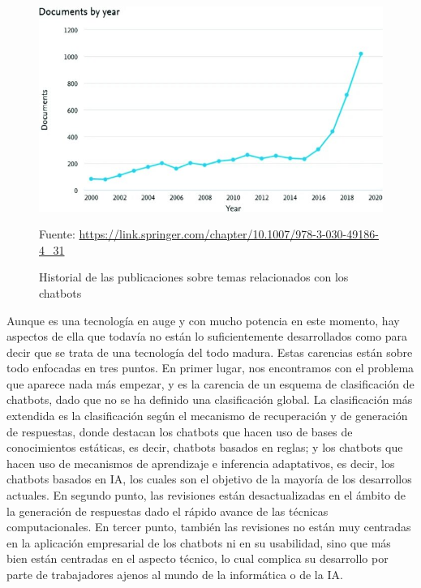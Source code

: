 \begin{figure}[h]
\centering
\includegraphics[width=1.0\textwidth]{imagenes/02_EstadoDelArte/publicaciones_chatbots.jpg}
\begin{center}
Fuente: \url{https://link.springer.com/chapter/10.1007/978-3-030-49186-4_31}
\end{center}
\caption{Historial de las publicaciones sobre temas relacionados con los chatbots}
\label{fig:publicaciones_chatbot}
\end{figure}

Aunque es una tecnología en auge y con mucho potencia en este momento, hay aspectos de ella que todavía no están lo suficientemente desarrollados como para decir que se trata de una tecnología del todo madura. Estas carencias están sobre todo enfocadas en tres puntos.
En primer lugar, nos encontramos con el problema que aparece nada más empezar, y es la carencia de un esquema de clasificación de chatbots, dado que no se ha definido una clasificación global. La clasificación más extendida es la clasificación según el mecanismo de recuperación y de generación de respuestas, donde destacan los chatbots que hacen uso de bases de conocimientos estáticas, es decir, chatbots basados en reglas; y los chatbots que hacen uso de mecanismos de aprendizaje e inferencia adaptativos, es decir, los chatbots basados en \gls{IA}, los cuales son el objetivo de la mayoría de los desarrollos actuales. En segundo punto, las revisiones están desactualizadas en el ámbito de la generación de respuestas dado el rápido avance de las técnicas computacionales. En tercer punto, también las revisiones no están muy centradas en la aplicación empresarial de los chatbots ni en su usabilidad, sino que más bien están centradas en el aspecto técnico, lo cual complica su desarrollo por parte de trabajadores ajenos al mundo de la informática o de la \gls{IA}.

